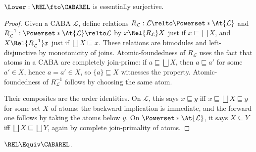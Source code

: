 \begin{lemma}
  \label{lemma:lower-dense}
  \(\Lower : \REL \fto \CABAREL\) is essentially surjective.
\end{lemma}
\begin{proof}
  Given a CABA $\mathcal{L}$, define relations
  \(R_\mathcal{L} : \mathcal{L} \relto \Powerset*{\At{\mathcal{L}}}\) and
  \(R^{-1}_\mathcal{L} : \Powerset*{\At{\mathcal{L}}} \relto \mathcal{L}\) by
  \(x \Rel{R_\mathcal{L}} X\) just if \(x \sqsubseteq \bigsqcup X\), and
  \(X \Rel{R^{-1}_\mathcal{L}} x\) just if \(\bigsqcup X \sqsubseteq x\).
  These relations are bimodules and left-disjunctive by monotonicity of joins.
  Atomic-foundedness of \(R_\mathcal{L}\) uses the fact that atoms in a CABA are
  completely join-prime: if \(a \sqsubseteq \bigsqcup X\), then
  \(a \sqsubseteq a'\) for some \(a' \in X\), hence \(a = a' \in X\), so
  \(\{a\} \sqsubseteq X\) witnesses the property. Atomic-foundedness of
  \(R^{-1}_\mathcal{L}\) follows by choosing the same atom.

  Their composites are the order identities. On \(\mathcal{L}\), this says
  \(x \sqsubseteq y\) iff \(x \sqsubseteq \bigsqcup X \sqsubseteq y\) for some
  set \(X\) of atoms; the backward implication is immediate, and the forward
  one follows by taking the atoms below \(y\). On
  \(\Powerset*{\At{\mathcal{L}}}\), it says \(X \subseteq Y\) iff
  \(\bigsqcup X \sqsubseteq \bigsqcup Y\), again by complete join-primality of
  atoms.
\end{proof}

\begin{theorem}
  \label{theorem:cabarel-preduality}
  \(\REL \Equiv \CABAREL\).
\end{theorem}


